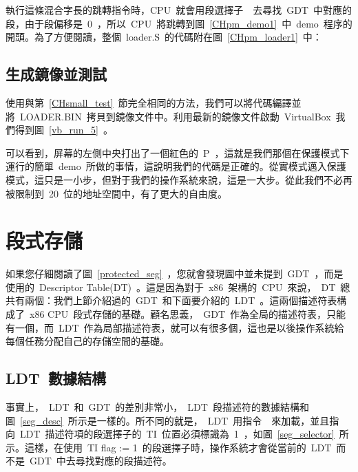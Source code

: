 執行這條混合字長的跳轉指令時，CPU~就會用段選擇子~~去尋找~GDT~中對應的段，由于段偏移是~0~，所以~CPU~將跳轉到圖~\ref{CHpm_demo1}~中~demo~程序的開頭。為了方便閱讀，整個~loader.S~的代碼附在圖~\ref{CHpm_loader1}~中：

\label{CHpm_loader1}

\subsection{生成鏡像並測試}

使用與第~\ref{CHsmall_test}~節完全相同的方法，我們可以將代碼編譯並將~LOADER.BIN~拷貝到鏡像文件中。利用最新的鏡像文件啟動~VirtualBox~我們得到圖~\ref{vb_run_5}~。

可以看到，屏幕的左側中央打出了一個紅色的~P~，這就是我們那個在保護模式下運行的簡單~demo~所做的事情，這說明我們的代碼是正確的。從實模式邁入保護模式，這只是一小步，但對于我們的操作系統來說，這是一大步。從此我們不必再被限制到~20~位的地址空間中，有了更大的自由度。


\section{段式存儲}

如果您仔細閱讀了圖~\ref{protected_seg}~，您就會發現圖中並未提到~GDT~，而是使用的~Descriptor Table(DT)~。這是因為對于~x86~架構的~CPU~來說，~DT~總共有兩個：我們上節介紹過的~GDT~和下面要介紹的~LDT~。這兩個描述符表構成了~x86 CPU~段式存儲的基礎。顧名思義，~GDT~作為全局的描述符表，只能有一個，而~LDT~作為局部描述符表，就可以有很多個，這也是以後操作系統給每個任務分配自己的存儲空間的基礎。

\subsection{LDT~數據結構} \label{CHpm_ldt}


事實上，~LDT~和~GDT~的差別非常小，~LDT~段描述符的數據結構和圖~\ref{seg_desc}~所示是一樣的。所不同的就是，~LDT~用指令~~來加載，並且指向~LDT~描述符項的段選擇子的~TI~位置必須標識為~1~，如圖~\ref{seg_selector}~所示。這樣，在使用~TI flag := 1~的段選擇子時，操作系統才會從當前的~LDT~而不是~GDT~中去尋找對應的段描述符。

